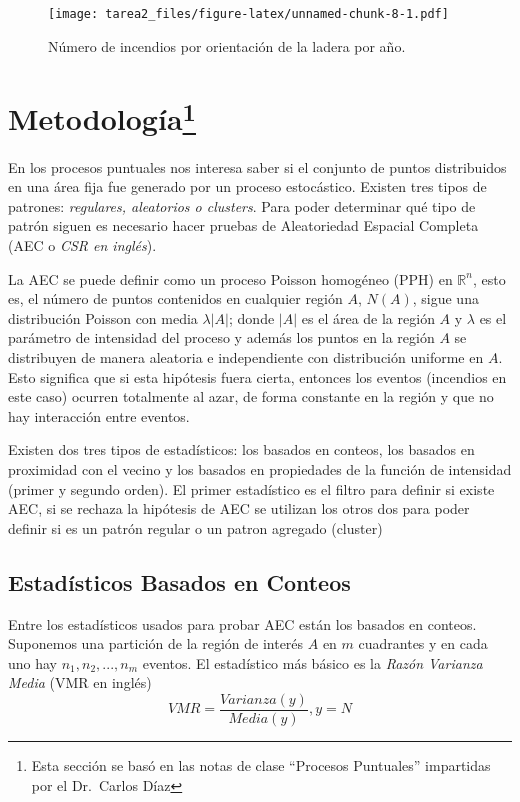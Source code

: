 \documentclass[12,]{article}
\let\rmarkdownfootnote\footnote%
\def\footnote{\protect\rmarkdownfootnote}
\begin{document}
\begin{figure}[H]
\centering
\texttt{[image: tarea2\_files/figure-latex/unnamed-chunk-8-1.pdf]}
\caption{Número de incendios por orientación de la ladera por año.}
\end{figure}

\section[Metodología]{Metodología\footnote{Esta sección se basó en las
  notas de clase ``Procesos Puntuales'' impartidas por el Dr.~Carlos
  Díaz}}\label{metodologia}

En los procesos puntuales nos interesa saber si el conjunto de puntos
distribuidos en una área fija fue generado por un proceso estocástico.
Existen tres tipos de patrones: \emph{regulares, aleatorios o clusters}.
Para poder determinar qué tipo de patrón siguen es necesario hacer
pruebas de Aleatoriedad Espacial Completa (AEC o \emph{CSR en inglés}).

La AEC se puede definir como un proceso Poisson homogéneo (PPH) en
$\mathbb{R}^n$, esto es, el número de puntos contenidos en cualquier
región $A$, $N(A)$, sigue una distribución Poisson con media
$\lambda \vert A \vert$; donde $\vert A \vert$ es el área de la región
$A$ y $\lambda$ es el parámetro de intensidad del proceso y además los
puntos en la región $A$ se distribuyen de manera aleatoria e
independiente con distribución uniforme en $A$. Esto significa que si
esta hipótesis fuera cierta, entonces los eventos (incendios en este
caso) ocurren totalmente al azar, de forma constante en la región y que
no hay interacción entre eventos.

Existen dos tres tipos de estadísticos: los basados en conteos, los
basados en proximidad con el vecino y los basados en propiedades de la
función de intensidad (primer y segundo orden). El primer estadístico es
el filtro para definir si existe AEC, si se rechaza la hipótesis de AEC
se utilizan los otros dos para poder definir si es un patrón regular o
un patron agregado (cluster)

\subsection{Estadísticos Basados en
Conteos}\label{estadisticos-basados-en-conteos}

Entre los estadísticos usados para probar AEC están los basados en
conteos. Suponemos una partición de la región de interés $A$ en $m$
cuadrantes y en cada uno hay $n_1, n_2, ..., n_m$ eventos. El
estadístico más básico es la \textit{Razón Varianza Media} (VMR en
inglés) \[
VMR = \frac{Varianza(y)}{Media(y)}, y = N
\]
\end{document}
